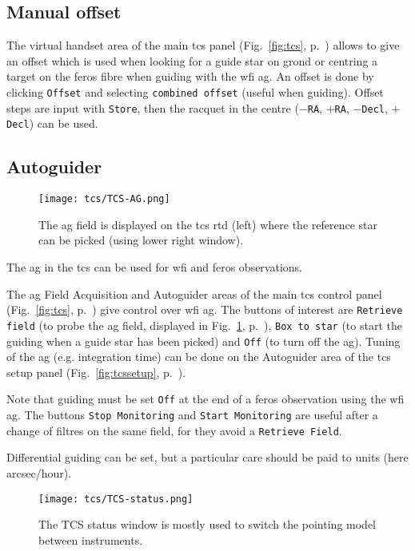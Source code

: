\documentclass[11pt,fleqn]{book}
\def\figref#1{Fig.~\ref{fig:#1}, p.~\pageref{fig:#1}}
\begin{document}
\subsection{Manual offset}
\label{manualoffset}

The virtual handset area of the main \gls{tcs} panel (\figref{tcs})
allows to give an offset which is used when looking for a guide star on
\gls{grond} or centring a target on the \gls{feros} fibre when guiding with the
\gls{wfi} \gls{ag}.  An offset is done by clicking \texttt{Offset} and
selecting \texttt{combined offset} (useful when guiding).  Offset steps are
input with \texttt{Store}, then the racquet in the centre (\texttt{$-$RA},
\texttt{$+$RA}, \texttt{$-$Decl}, \texttt{$+$Decl}) can be used.

\subsection{Autoguider}
\label{autoguider}

\begin{figure}[!ht]
\centering
\texttt{[image: tcs/TCS-AG.png]}
\caption[WFI autoguider]{The \gls{ag} field is displayed on the \gls{tcs} \gls{rtd} (left) where the
 reference star can be picked (using lower right window).} 
\label{fig:tcsag}
\end{figure}
The \gls{ag} in the \gls{tcs} can be used for \gls{wfi} and \gls{feros} observations.

The \gls{ag} Field Acquisition and Autoguider areas of the main \gls{tcs}
control panel (\figref{tcs}) give control over \gls{wfi} \gls{ag}.  The buttons
of interest are \texttt{Retrieve field} (to probe the \gls{ag} field, displayed
in \figref{tcsag}), \texttt{Box to star} (to start the guiding when a guide
star has been picked) and \texttt{Off} (to turn off the \gls{ag}).  Tuning of
the \gls{ag} (e.g. integration time) can be done on  the Autoguider area of the
\gls{tcs} setup panel (\figref{tcssetup}).

Note that guiding must be set \texttt{Off} at the end of a \gls{feros}
observation using the \gls{wfi} \gls{ag}. The buttons \texttt{Stop Monitoring}
and \texttt{Start Monitoring} are useful after a change of filtres on the same
field, for they avoid a \texttt{Retrieve Field}.

Differential guiding can be set, but a particular care should be paid
to units (here arcsec/hour).


\begin{figure}[!ht]
\centering
\texttt{[image: tcs/TCS-status.png]}
\caption[Status window of the telescope control software]{The TCS status window is mostly used to switch the pointing model
between instruments.}
\label{fig:tcsstatus}
\end{figure}
\end{document}
